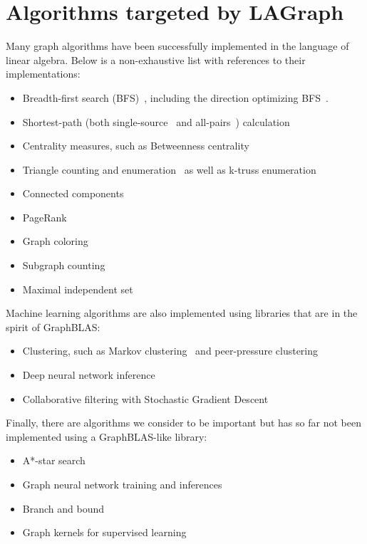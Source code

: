 \section{Algorithms targeted by LAGraph}
\label{sec:algorithms}

Many graph algorithms have been successfully implemented in the language of linear algebra. Below is a non-exhaustive list with references to their implementations:

\begin{itemize}
\item Breadth-first search (BFS)~\cite{bulucc2011parallel, gbtl-cuda16, Davis19}, including the direction optimizing BFS~\cite{Yang:2018:IPE}.
\item Shortest-path (both single-source~\cite{Yang:2019:GBL, ssspgrapl19} and all-pairs~\cite{ca_apsp}) calculation
\item Centrality measures, such as Betweenness centrality~\cite{combblas}
\item Triangle counting and enumeration~\cite{trianglegabb15, wang2016comparative} as well as k-truss enumeration~\cite{}
\item Connected components~\cite{lacc2019}
\item PageRank~\cite{satish2014navigating}
\item Graph coloring~\cite{coloringgrapl19}
\item Subgraph counting~\cite{chen2019graphblas}
\item Maximal independent set~\cite{jpdc15, Yang:2019:GBL}
\end{itemize}

Machine learning algorithms are also implemented using libraries that are in the spirit of GraphBLAS:
\begin{itemize}
\item Clustering, such as Markov clustering~\cite{azad2018hipmcl} and peer-pressure clustering~\cite{}
\item Deep neural network inference~\cite{kepner2017enabling}
\item Collaborative filtering with Stochastic Gradient Descent~\cite{satish2014navigating}
\end{itemize}

Finally, there are algorithms we consider to be important but has so far not been implemented using a GraphBLAS-like library:
\begin{itemize}
\item A*-star search
\item Graph neural network training and inferences
\item Branch and bound
\item Graph kernels for supervised learning
\end{itemize}
